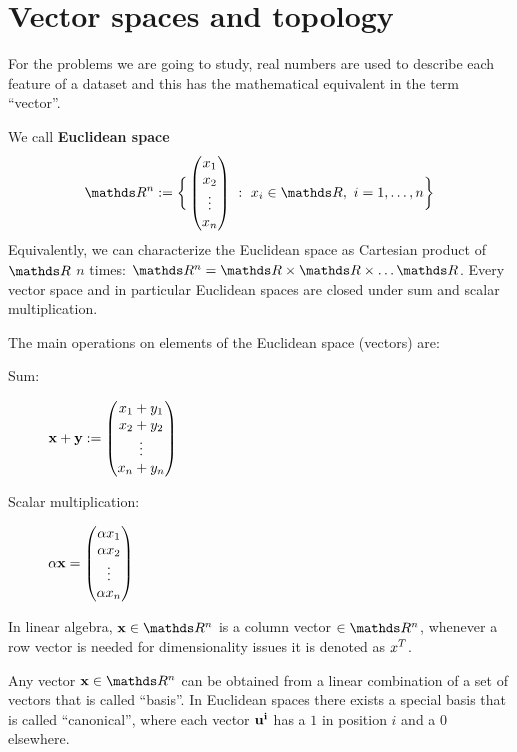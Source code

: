 \documentclass[computationalMathematics.tex]{subfiles}
\begin{document}
\section{Vector spaces and topology}\label{21sett_sec:vector_space}
For the problems we are going to study, real numbers are used to describe each feature of a dataset and this has the mathematical equivalent in the term ``vector''.

\begin{definition}
We call \textbf{Euclidean space}
\[
  \R^n :=\biggl \{ \, \begin{pmatrix}x_1\\ x_2\\ \vdots\\ x_n\end{pmatrix}~:~x_i \in \R,~i = 1, \ldots, n \biggr \}
\]
Equivalently, we can characterize the Euclidean space as Cartesian product of $\R$ $n$ times: $\R^n = \R \times \R \times \ldots \R$.
Every vector space and in particular Euclidean spaces are closed under sum and scalar multiplication.
\end{definition}

\noindent The main operations on elements of the Euclidean space (vectors) are:

\begin{description}
  \item[{\sc Sum:}] ${\bf x } + {\bf y } := \begin{pmatrix}x_1 + y_1\\
      x_2 + y_2\\
      \vdots\\
      x_n + y_n\\
  \end{pmatrix}$
\item[{\sc Scalar multiplication:}] $\alpha {\bf x } = \begin{pmatrix}\alpha x_1\\
    \alpha x_2\\
    \vdots\\
    \alpha x_n\\
  \end{pmatrix}$
\end{description}

In linear algebra, $\vect{x} \in \R^n$ is a column vector $\in \R^n$, whenever a row vector is needed for dimensionality issues it is denoted as ${x}^{T}$.

\begin{definition}[Basis]
	Any vector $\vect{x} \in \R^n$ can be obtained from a linear combination of a set of vectors that is called ``basis''.
	In Euclidean spaces there exists a special basis that is called ``canonical'', where each vector ${\bf u^i }$ has a $1$ in position $i$ and a $0$ elsewhere.
\end{definition}
\end{document}
